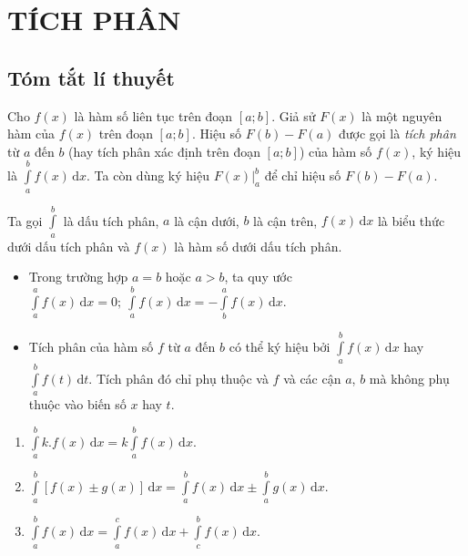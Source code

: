 \section{TÍCH PHÂN}
\subsection{Tóm tắt lí thuyết}
	\begin{dn}
		Cho $f(x)$ là hàm số liên tục trên đoạn $[a;b]$. Giả sử $F(x)$ là một nguyên hàm của $f(x)$ trên đoạn $[a;b]$. Hiệu số $F(b)-F(a)$ được gọi là \emph{tích phân} từ $a$ đến $b$ (hay tích phân xác định trên đoạn $[a;b]$) của hàm số $f(x)$, ký hiệu là $\displaystyle\int\limits_a^b f(x)\,\mathrm{d}x$. Ta còn dùng ký hiệu $F(x)\bigr|_a^b$ để chỉ hiệu số $F(b)-F(a)$.
		
		Ta gọi $\displaystyle\int\limits_a^b$ là dấu tích phân, $a$ là cận dưới, $b$ là cận trên, $f(x)\,\mathrm{d}x$ là biểu thức dưới dấu tích phân và $f(x)$ là hàm số dưới dấu tích phân.
	\end{dn}
	\begin{note}
		\begin{itemize}
			\item Trong trường hợp $a=b$ hoặc $a>b$, ta quy ước $\displaystyle\int\limits_a^a f(x)\,\mathrm{d}x=0;\ \int\limits_a^b f(x)\,\mathrm{d}x=-\int\limits_b^a f(x)\,\mathrm{d}x$.
			\item Tích phân của hàm số $f$ từ $a$ đến $b$ có thể ký hiệu bởi $\displaystyle\int\limits_a^b f(x)\,\mathrm{d}x$ hay $\displaystyle\int\limits_a^b f(t)\,\mathrm{d}t$. Tích phân đó chỉ phụ thuộc và $f$ và các cận $a$, $b$ mà không phụ thuộc vào biến số $x$ hay $t$.
		\end{itemize}
	\end{note}
	\begin{tc}
		\begin{enumerate}
			\item $\displaystyle\int\limits_a^b k.f(x)\,\mathrm{d}x=k\int\limits_a^b f(x)\,\mathrm{d}x$.
			\item $\displaystyle\int\limits_a^b [f(x)\pm g(x)]\,\mathrm{d}x=\int\limits_a^b f(x)\,\mathrm{d}x\pm\int\limits_a^b g(x)\,\mathrm{d}x$.
			\item $\displaystyle\int\limits_a^b f(x)\,\mathrm{d}x=\int\limits_a^c f(x)\,\mathrm{d}x+\int\limits_c^b f(x)\,\mathrm{d}x$.
		\end{enumerate}
	\end{tc}
